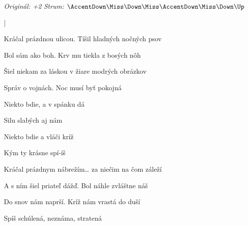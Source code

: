 \begin{song}


\begin{headerbox}
\RaiseBoxWithAccents
\textit{Originál: +2} \quad
\textit{Strum:} $\AccentDown\Miss\Down\Miss\AccentDown\Miss\Down\Up$
\end{headerbox}

\begin{hchordbox}
\end{hchordbox}

\Large

\bigskip

\Intro {}    |     \par

\bigskip

Kráčal prázdnou ulicou. Tíšil hladných nočných psov \par
Bol sám  ako boh. Krv mu tiekla z bosých nôh \par

\bigskip

 Šiel niekam za láskou v žiare modrých obrázkov \par
{}Správ  o vojnách. Noc musí byť pokojná \par

\bigskip

Niekto bdie, a v spánku dá \par
{} Silu slabých aj nám \par
{} Niekto bdie a vláči kríž \par
{} Kým ty krásne spí-íš  \par

\bigskip

Kráčal prázdnym nábrežím… za niečim na čom záleží \par
A s ním šiel priateľ dážď. Bol náhle zvláštne náš \par

\bigskip

 Do snov nám naprší. Kríž nám vrastá  do duší \par
{}Spíš schúlená, neznáma, stratená \par


\end{song}
